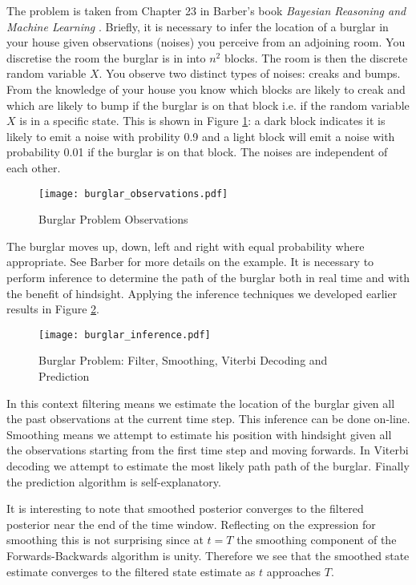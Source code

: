 The problem is taken from Chapter 23 in Barber's book \textit{Bayesian Reasoning and Machine Learning} \cite{barber}. Briefly, it is necessary to infer the location of a burglar in your house given observations (noises) you perceive from an adjoining room. You discretise the room the burglar is in into $n^2$ blocks. The room is then the discrete random variable $X$. You observe two distinct types of noises: creaks and bumps. From the knowledge of your house you know which blocks are likely to creak and which are likely to bump if the burglar is on that block i.e. if the random variable $X$ is in a specific state. This is shown in Figure \ref{fig_burlgar_observations}: a dark block indicates it is likely to emit a noise with probility 0.9 and a light block will emit a noise with probability 0.01 if the burglar is on that block. The noises are independent of each other.
\begin{figure}[H] 
\centering
\texttt{[image: burglar\_observations.pdf]}
\caption{Burglar Problem Observations}
\label{fig_burlgar_observations}
\end{figure}
The burglar moves up, down, left and right with equal probability where appropriate. See Barber for more details on the example. It is necessary to perform inference to determine the path of the burglar both in real time and with the benefit of hindsight. Applying the inference techniques we developed earlier results in Figure \ref{fig_burglar_inference}. 
\begin{figure}[H] 
\centering
\texttt{[image: burglar\_inference.pdf]}
\caption{Burglar Problem: Filter, Smoothing, Viterbi Decoding and Prediction}
\label{fig_burglar_inference}
\end{figure}
In this context filtering means we estimate the location of the burglar given all the past observations at the current time step. This inference can be done on-line. Smoothing means we attempt to estimate his position with hindsight given all the observations starting from the first time step and moving forwards. In Viterbi decoding we attempt to estimate the most likely path path of the burglar. Finally the prediction algorithm is self-explanatory.

It is interesting to note that smoothed posterior converges to the filtered posterior near the end of the time window. Reflecting on the expression for smoothing this is not surprising since at $t=T$ the smoothing component of the Forwards-Backwards algorithm is unity. Therefore we see that the smoothed state estimate converges to the filtered state estimate as $t$ approaches $T$.

